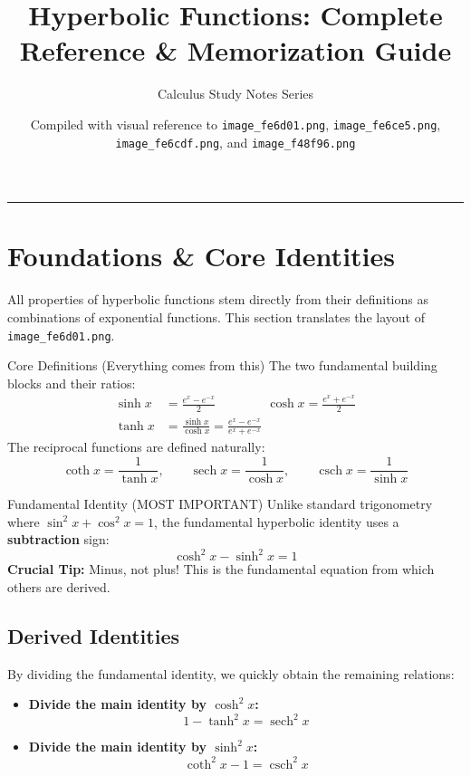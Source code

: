 \documentclass[11pt, a4paper]{article}
\title{\textbf{Hyperbolic Functions: Complete Reference \& Memorization Guide}}
\author{Calculus Study Notes Series}
\date{\small Compiled with visual reference to \texttt{image\_fe6d01.png}, \texttt{image\_fe6ce5.png}, \texttt{image\_fe6cdf.png}, and \texttt{image\_f48f96.png}}
\DeclareMathOperator{\sech}{sech}
\DeclareMathOperator{\csch}{csch}
\begin{document}
\maketitle

\hrule
\vspace{0.4cm}

\section{Foundations \& Core Identities}
\label{sec:foundations}
All properties of hyperbolic functions stem directly from their definitions as combinations of exponential functions. This section translates the layout of \texttt{image\_fe6d01.png}.

\begin{keyconcept}{Core Definitions (Everything comes from this)}
The two fundamental building blocks and their ratios:
\begin{align*}
    \sinh x &= \frac{e^x - e^{-x}}{2} \qquad\qquad \cosh x = \frac{e^x + e^{-x}}{2} \\[10pt]
    \tanh x &= \frac{\sinh x}{\cosh x} = \frac{e^x - e^{-x}}{e^x + e^{-x}}
\end{align*}
The reciprocal functions are defined naturally:
\[
    \coth x = \frac{1}{\tanh x}, \qquad \sech x = \frac{1}{\cosh x}, \qquad \csch x = \frac{1}{\sinh x}
\]
\end{keyconcept}

\begin{warningnote}{Fundamental Identity (MOST IMPORTANT)}
Unlike standard trigonometry where $\sin^2 x + \cos^2 x = 1$, the fundamental hyperbolic identity uses a \textbf{subtraction} sign:
\begin{equation*}
    \cosh^2 x - \sinh^2 x = 1
\end{equation*}
\textbf{Crucial Tip:} Minus, not plus! This is the fundamental equation from which others are derived.
\end{warningnote}

\subsection{Derived Identities}
By dividing the fundamental identity, we quickly obtain the remaining relations:
\begin{itemize}
    \item \textbf{Divide the main identity by $\cosh^2 x$:}
    \[
        1 - \tanh^2 x = \sech^2 x
    \]
    \item \textbf{Divide the main identity by $\sinh^2 x$:}
    \[
        \coth^2 x - 1 = \csch^2 x
    \]
\end{itemize}
\end{document}
